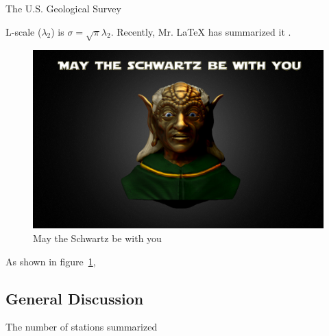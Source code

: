 \documentclass[11pt,twoside,twocolumn]{usgsreport}
\begin{document}
\ifdef{\makefrontcoveralt}{\makefrontcoveralt}{\makefrontcover}
\makefrontmatter
\pagestyle{body}

The U.S. Geological Survey \lipsum[2-3]

L-scale ($\lambda_2$) is $\sigma = \sqrt{\pi}\lambda_2$. Recently, Mr. LaTeX has summarized it \citep{ASQUITH20074484}. \lipsum[150-150]

\lipsum[4-5]

\begin{figure}
\begin{center}
	\includegraphics[width=\linewidth]{figure1}

\caption{May the Schwartz be with you}
\label{fig-1}
\end{center}
\end{figure}


As shown in figure~\ref{fig-1}, \lipsum[34-36]


\subsection{General Discussion}

The number of stations summarized \lipsum[40-50]

\lipsum[14-20]

\REFSECTION




\vspace*{\fill}
\clearpage
\pagestyle{backofreport}
\makebackcover
\end{document}
